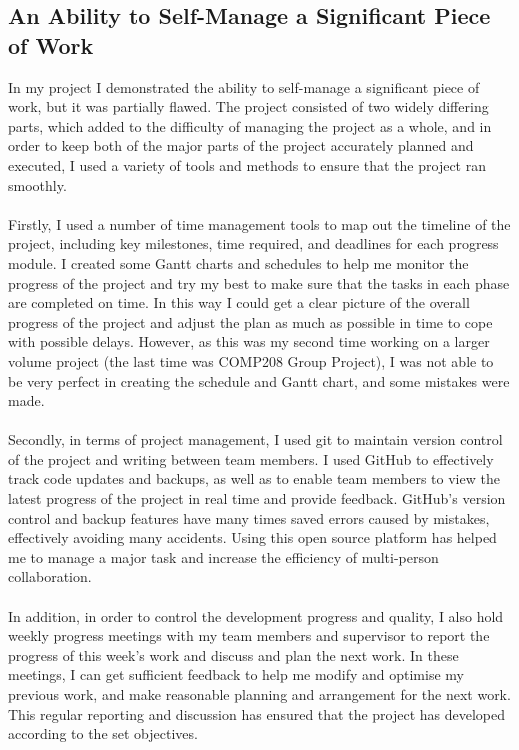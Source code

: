 \documentclass[12pt]{article}
\begin{document}
\subsection{An Ability to Self-Manage a Significant Piece of Work}
In my project I demonstrated the ability to self-manage a significant piece of work, but it was partially flawed. The project consisted of two widely differing parts, which added to the difficulty of managing the project as a whole, and in order to keep both of the major parts of the project accurately planned and executed, I used a variety of tools and methods to ensure that the project ran smoothly.
\\\\
Firstly, I used a number of time management tools to map out the timeline of the project, including key milestones, time required, and deadlines for each progress module. I created some Gantt charts and schedules to help me monitor the progress of the project and try my best to make sure that the tasks in each phase are completed on time. In this way I could get a clear picture of the overall progress of the project and adjust the plan as much as possible in time to cope with possible delays. However, as this was my second time working on a larger volume project (the last time was COMP208 Group Project), I was not able to be very perfect in creating the schedule and Gantt chart, and some mistakes were made.
\\\\
Secondly, in terms of project management, I used \gls{git} to maintain version control of the project and writing between team members. I used GitHub to effectively track code updates and backups, as well as to enable team members to view the latest progress of the project in real time and provide feedback. GitHub's version control and backup features have many times saved errors caused by mistakes, effectively avoiding many accidents. Using this open source platform has helped me to manage a major task and increase the efficiency of multi-person collaboration.
\\\\
In addition, in order to control the development progress and quality, I also hold weekly progress meetings with my team members and supervisor to report the progress of this week's work and discuss and plan the next work. In these meetings, I can get sufficient feedback to help me modify and optimise my previous work, and make reasonable planning and arrangement for the next work. This regular reporting and discussion has ensured that the project has developed according to the set objectives.
\end{document}
